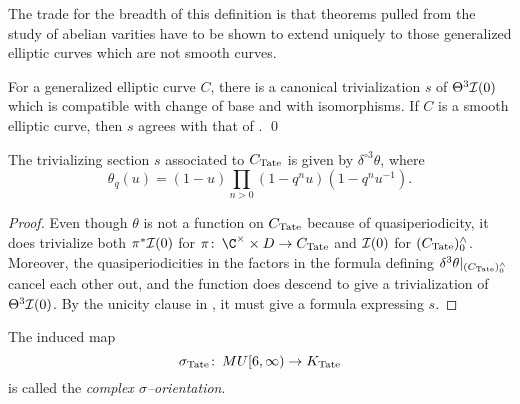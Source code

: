\noindent The trade for the breadth of this definition is that theorems pulled from the study of abelian varities have to be shown to extend uniquely to those generalized elliptic curves which are not smooth curves.

\begin{theorem}\label{GeneralizedTheta3IsTrivial}
For a generalized elliptic curve $C$, there is a canonical trivialization $s$ of $\Theta^3 \mathcal{I}(0)$ which is compatible with change of base and with isomorphisms.  If $C$ is a smooth elliptic curve, then $s$ agrees with that of . \qed
\end{theorem}

\begin{corollary}\label{D3thetaTrivializes}
The trivializing section $s$ associated to $C_{\mathrm{Tate}}$ is given by $\delta^{\circ 3} \theta$, where \[\theta_q(u) = (1 - u)\prod_{n > 0}(1 - q^n u)(1 - q^n u^{-1}).\]
\end{corollary}
\begin{proof}
Even though $\theta$ is not a function on $C_{\mathrm{Tate}}$ because of quasiperiodicity, it does trivialize both $\pi^* \mathcal{I}(0)$ for $\pi\co \C^\times \times D \to C_{\Tate}$ and $\mathcal{I}(0)$ for $(C_{\mathrm{Tate}})^\wedge_0$.  Moreover, the quasiperiodicities in the factors in the formula defining $\delta^3 \theta|_{(C_{\mathrm{Tate}})^\wedge_0}$ cancel each other out, and the function does descend to give a trivialization of $\Theta^3 \mathcal{I}(0)$.  By the unicity clause in , it must give a formula expressing $s$.
\end{proof}

\begin{definition}
The induced map \[\sigma_{\mathrm{Tate}}\colon\thinspace MU[6, \infty) \to K_{\mathrm{Tate}}\] is called the \textit{complex $\sigma$--orientation}.
\end{definition}

